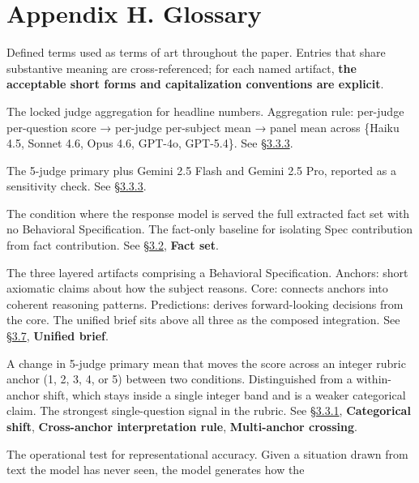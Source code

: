 \hypertarget{appendix-h.-glossary}{%
\section{Appendix H. Glossary}\label{appendix-h.-glossary}}

Defined terms used as terms of art throughout the paper. Entries that
share substantive meaning are cross-referenced; for each named artifact,
\textbf{the acceptable short forms and capitalization conventions are
explicit}.

\begin{description}
\tightlist
\item[5-judge primary panel]
The locked judge aggregation for headline numbers. Aggregation rule:
per-judge per-question score → per-judge per-subject mean → panel mean
across \{Haiku 4.5, Sonnet 4.6, Opus 4.6, GPT-4o, GPT-5.4\}. See \hyperref[calibration]{§3.3.3}.
\item[7-judge sensitivity panel]
The 5-judge primary plus Gemini 2.5 Flash and Gemini 2.5 Pro, reported
as a sensitivity check. See \hyperref[calibration]{§3.3.3}.
\item[All Facts (C4)]
The condition where the response model is served the full extracted fact
set with no Behavioral Specification. The fact-only baseline for
isolating Spec contribution from fact contribution. See \hyperref[experimental-conditions]{§3.2},
\textbf{Fact set}.
\item[Anchors / Core / Predictions]
The three layered artifacts comprising a Behavioral Specification.
Anchors: short axiomatic claims about how the subject reasons. Core:
connects anchors into coherent reasoning patterns. Predictions: derives
forward-looking decisions from the core. The unified brief sits above
all three as the composed integration. See \hyperref[pipeline-for-the-behavioral-specification]{§3.7}, \textbf{Unified brief}.
\item[Anchor crossing]
A change in 5-judge primary mean that moves the score across an integer
rubric anchor (1, 2, 3, 4, or 5) between two conditions. Distinguished
from a within-anchor shift, which stays inside a single integer band and
is a weaker categorical claim. The strongest single-question signal in
the rubric. See \hyperref[score-interpretation]{§3.3.1}, \textbf{Categorical shift}, \textbf{Cross-anchor
interpretation rule}, \textbf{Multi-anchor crossing}.
\item[Behavioral prediction]
The operational test for representational accuracy. Given a situation
drawn from text the model has never seen, the model generates how the

\end{description}
